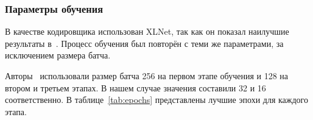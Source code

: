 \subsubsection{Параметры обучения}

В качестве кодировщика использован XLNet, так как он показал наилучшие результаты в~\cite{b15}. Процесс обучения был повторён с теми же параметрами, за исключением размера батча.

Авторы~\cite{b15} использовали размер батча 256 на первом этапе обучения и 128 на втором и третьем этапах. В нашем случае значения составили 32 и 16 соответственно. В таблице~\ref{tab:epochs} представлены лучшие эпохи для каждого этапа.

